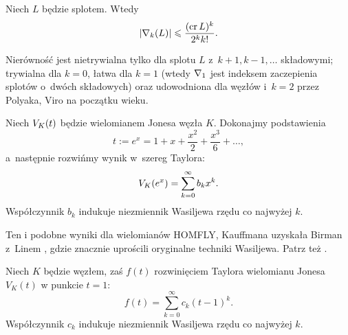 \begin{conjecture}
    Niech $L$ będzie splotem.
    Wtedy
    \begin{equation}
        |\nabla_k(L)| \leqslant \frac{(\operatorname{cr} L)^k}{2^kk!}.
    \end{equation}
\end{conjecture}

Nierówność jest nietrywialna tylko dla splotu $L$ z~$k+1, k-1, \ldots$ składowymi; trywialna dla $k = 0$, łatwa dla $k=1$ (wtedy $\nabla_1$ jest indeksem zaczepienia splotów o~dwóch składowych) oraz udowodniona dla węzłów i~$k=2$ przez Polyaka, Viro \cite{polyak2001} na początku wieku.
%
%

\begin{example}
%
    Niech $V_K(t)$ będzie wielomianem Jonesa węzła $K$.
    Dokonajmy podstawienia
    \begin{equation}
        t := e^x = 1 + x + \frac{x^2}{2} + \frac{x^3}{6} + \ldots,
    \end{equation}
    a~następnie rozwińmy wynik w~szereg Taylora:
    \begin{equation}
        V_K(e^x) = \sum_{k = 0}^\infty b_k x^k.
    \end{equation}
    Współczynnik $b_{k}$ indukuje niezmiennik Wasiljewa rzędu co najwyżej $k$.
\end{example}

Ten i podobne wyniki dla wielomianów HOMFLY, Kauffmana uzyskała Birman z~Linem \cite{birman1993}, gdzie znacznie uprościli oryginalne techniki Wasiljewa.
%
%
Patrz też \cite[s. 56]{chmutov2012}.
%

\begin{example}
    Niech $K$ będzie węzłem, zaś $f(t)$ rozwinięciem Taylora wielomianu Jonesa $V_K(t)$ w punkcie $t = 1$:
    \begin{equation}
        f(t) = \sum_{k = 0}^\infty c_k (t-1)^k.
    \end{equation}
    Współczynnik $c_{k}$ indukuje niezmiennik Wasiljewa rzędu co najwyżej $k$.
\end{example}

